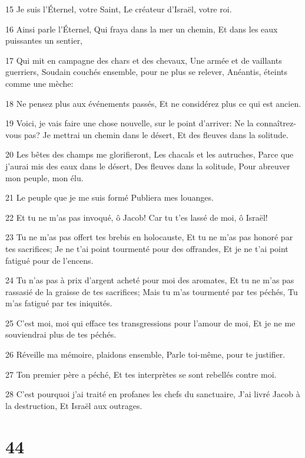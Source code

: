 \par 15 Je suis l'Éternel, votre Saint, Le créateur d'Israël, votre roi.
\par 16 Ainsi parle l'Éternel, Qui fraya dans la mer un chemin, Et dans les eaux puissantes un sentier,
\par 17 Qui mit en campagne des chars et des chevaux, Une armée et de vaillants guerriers, Soudain couchés ensemble, pour ne plus se relever, Anéantis, éteints comme une mèche:
\par 18 Ne pensez plus aux événements passés, Et ne considérez plus ce qui est ancien.
\par 19 Voici, je vais faire une chose nouvelle, sur le point d'arriver: Ne la connaîtrez-vous pas? Je mettrai un chemin dans le désert, Et des fleuves dans la solitude.
\par 20 Les bêtes des champs me glorifieront, Les chacals et les autruches, Parce que j'aurai mis des eaux dans le désert, Des fleuves dans la solitude, Pour abreuver mon peuple, mon élu.
\par 21 Le peuple que je me suis formé Publiera mes louanges.
\par 22 Et tu ne m'as pas invoqué, ô Jacob! Car tu t'es lassé de moi, ô Israël!
\par 23 Tu ne m'as pas offert tes brebis en holocauste, Et tu ne m'as pas honoré par tes sacrifices; Je ne t'ai point tourmenté pour des offrandes, Et je ne t'ai point fatigué pour de l'encens.
\par 24 Tu n'as pas à prix d'argent acheté pour moi des aromates, Et tu ne m'as pas rassasié de la graisse de tes sacrifices; Mais tu m'as tourmenté par tes péchés, Tu m'as fatigué par tes iniquités.
\par 25 C'est moi, moi qui efface tes transgressions pour l'amour de moi, Et je ne me souviendrai plus de tes péchés.
\par 26 Réveille ma mémoire, plaidons ensemble, Parle toi-même, pour te justifier.
\par 27 Ton premier père a péché, Et tes interprètes se sont rebellés contre moi.
\par 28 C'est pourquoi j'ai traité en profanes les chefs du sanctuaire, J'ai livré Jacob à la destruction, Et Israël aux outrages.

\chapter{44}

